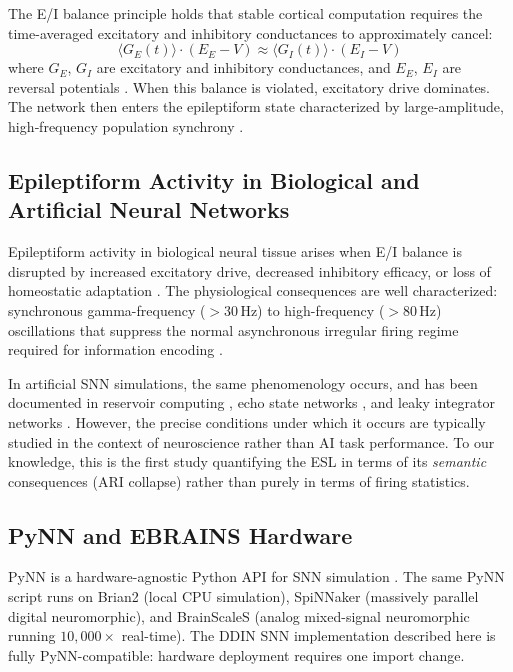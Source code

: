 \documentclass{article}
\begin{document}
The E/I balance principle holds that stable cortical computation requires the time-averaged excitatory and inhibitory conductances to approximately cancel:
\begin{equation}
\langle G_E(t) \rangle \cdot (E_E - V) \approx \langle G_I(t) \rangle \cdot (E_I - V)
\label{eq:ei_balance}
\end{equation}
where $G_E$, $G_I$ are excitatory and inhibitory conductances, and $E_E$, $E_I$ are reversal potentials \citep{vogel2005, brunel2000}. When this balance is violated, excitatory drive dominates. The network then enters the epileptiform state characterized by large‑amplitude, high‑frequency population synchrony \citep{strogatz2000}.

\subsection{Epileptiform Activity in Biological and Artificial Neural Networks}

Epileptiform activity in biological neural tissue arises when E/I balance is disrupted by increased excitatory drive, decreased inhibitory efficacy, or loss of homeostatic adaptation \citep{strogatz2000, fröhlich2016}. The physiological consequences are well characterized: synchronous gamma-frequency ($>30$\,Hz) to high-frequency ($>80$\,Hz) oscillations that suppress the normal asynchronous irregular firing regime required for information encoding \citep{brunel2000}.

In artificial SNN simulations, the same phenomenology occurs, and has been documented in reservoir computing \citep{maass2002}, echo state networks \citep{jaeger2004}, and leaky integrator networks \citep{sussillo2009}. However, the precise conditions under which it occurs are typically studied in the context of neuroscience rather than AI task performance. To our knowledge, this is the first study quantifying the ESL in terms of its \textit{semantic} consequences (ARI collapse) rather than purely in terms of firing statistics.

\subsection{PyNN and EBRAINS Hardware}

PyNN is a hardware-agnostic Python API for SNN simulation \citep{davison2008}. The same PyNN script runs on Brian2 (local CPU simulation), SpiNNaker (massively parallel digital neuromorphic), and BrainScaleS (analog mixed-signal neuromorphic running $10{,}000 \times$ real-time). The DDIN SNN implementation described here is fully PyNN-compatible: hardware deployment requires one import change.
\end{document}
